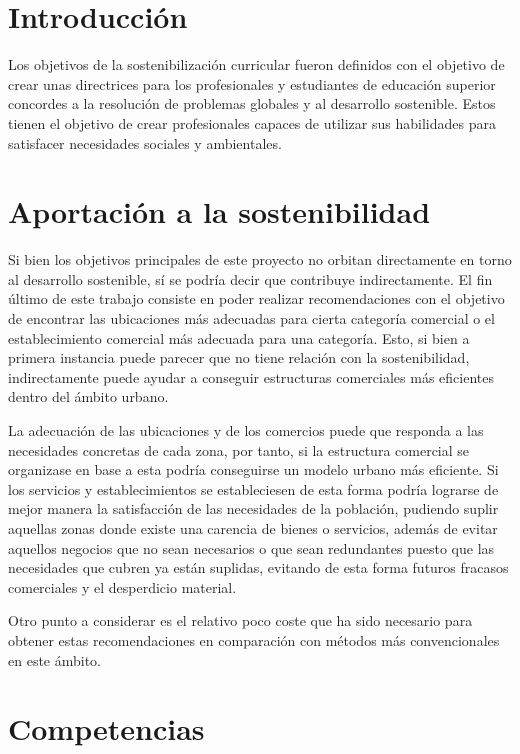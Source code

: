 
\section{Introducción}

Los objetivos de la sostenibilización curricular fueron definidos con el objetivo de crear unas directrices para los profesionales y estudiantes de educación superior concordes a la resolución de problemas globales y al desarrollo sostenible. Estos tienen el objetivo de crear profesionales capaces de utilizar sus habilidades para satisfacer necesidades sociales y ambientales.



\section{Aportación a la sostenibilidad}

Si bien los objetivos principales de este proyecto no orbitan directamente en torno al desarrollo sostenible, sí se podría decir que contribuye indirectamente. El fin último de este trabajo consiste en poder realizar recomendaciones con el objetivo de encontrar las ubicaciones más adecuadas para cierta categoría comercial o el establecimiento comercial más adecuada para una categoría. Esto, si bien a primera instancia puede parecer que no tiene relación con la sostenibilidad, indirectamente puede ayudar a conseguir estructuras comerciales más eficientes dentro del ámbito urbano.

La adecuación de las ubicaciones y de los comercios puede que responda a las necesidades concretas de cada zona, por tanto, si la estructura comercial se organizase en base a esta podría conseguirse un modelo urbano más eficiente. Si los servicios y establecimientos se estableciesen de esta forma podría lograrse de mejor manera la satisfacción de las necesidades de la población, pudiendo suplir aquellas zonas donde existe una carencia de bienes o servicios, además de evitar aquellos negocios que no sean necesarios o que sean redundantes puesto que las necesidades que cubren ya están suplidas, evitando de esta forma futuros fracasos comerciales y el desperdicio material.

Otro punto a considerar es el relativo poco coste que ha sido necesario para obtener estas recomendaciones en comparación con métodos más convencionales en este ámbito.
\section{Competencias}
